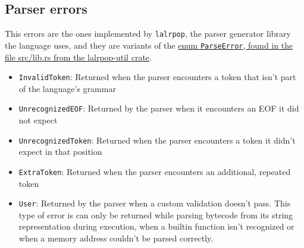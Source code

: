 \documentclass[11pt]{scrreprt}
\begin{document}
\subsection{Parser errors}
This errors are the ones implemented by \texttt{lalrpop}, the parser generator library the language uses, and they are variants of the \href{https://github.com/lalrpop/lalrpop/blob/fc9986c725d908a60b11d8480711afa33f7f3564/lalrpop-util/src/lib.rs#L15}{enum \texttt{ParseError}, found in the file src/lib.rs from the lalrpop-util crate}.
\begin{itemize}
  \item \texttt{InvalidToken}: Returned when the parser encounters a token that isn't part of the language's grammar
  \item \texttt{UnrecognizedEOF}: Returned by the parser when it encounters an EOF it did not expect
  \item \texttt{UnrecognizedToken}: Returned when the parser encounters a token it didn't expect in that position
  \item \texttt{ExtraToken}: Returned when the parser encounters an additional, repeated token
  \item \texttt{User}: Returned by the parser when a custom validation doesn't pass. This type of error is can only be returned while parsing bytecode from its string representation during execution, when a builtin function isn't recognized or when a memory address couldn't be parsed correctly.
\end{itemize}
\end{document}
